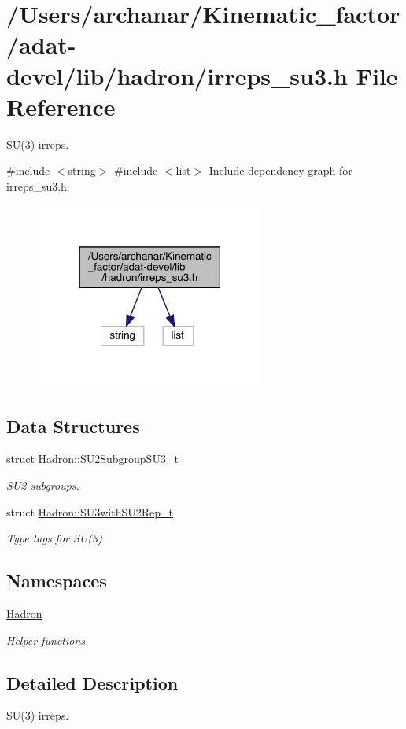 \hypertarget{adat-devel_2lib_2hadron_2irreps__su3_8h}{}\section{/\+Users/archanar/\+Kinematic\+\_\+factor/adat-\/devel/lib/hadron/irreps\+\_\+su3.h File Reference}
\label{adat-devel_2lib_2hadron_2irreps__su3_8h}


S\+U(3) irreps.  


{\ttfamily \#include $<$string$>$}\newline
{\ttfamily \#include $<$list$>$}\newline
Include dependency graph for irreps\+\_\+su3.\+h\+:
\nopagebreak
\begin{figure}[H]
\begin{center}
\leavevmode
\includegraphics[width=214pt]{d5/d92/adat-devel_2lib_2hadron_2irreps__su3_8h__incl}
\end{center}
\end{figure}
\subsection*{Data Structures}
\begin{DoxyCompactItemize}
\item 
struct \mbox{\hyperlink{structHadron_1_1SU2SubgroupSU3__t}{Hadron\+::\+S\+U2\+Subgroup\+S\+U3\+\_\+t}}
\begin{DoxyCompactList}\small\item\em S\+U2 subgroups. \end{DoxyCompactList}\item 
struct \mbox{\hyperlink{structHadron_1_1SU3withSU2Rep__t}{Hadron\+::\+S\+U3with\+S\+U2\+Rep\+\_\+t}}
\begin{DoxyCompactList}\small\item\em Type tags for S\+U(3) \end{DoxyCompactList}\end{DoxyCompactItemize}
\subsection*{Namespaces}
\begin{DoxyCompactItemize}
\item 
 \mbox{\hyperlink{namespaceHadron}{Hadron}}
\begin{DoxyCompactList}\small\item\em Helper functions. \end{DoxyCompactList}\end{DoxyCompactItemize}


\subsection{Detailed Description}
S\+U(3) irreps. 

